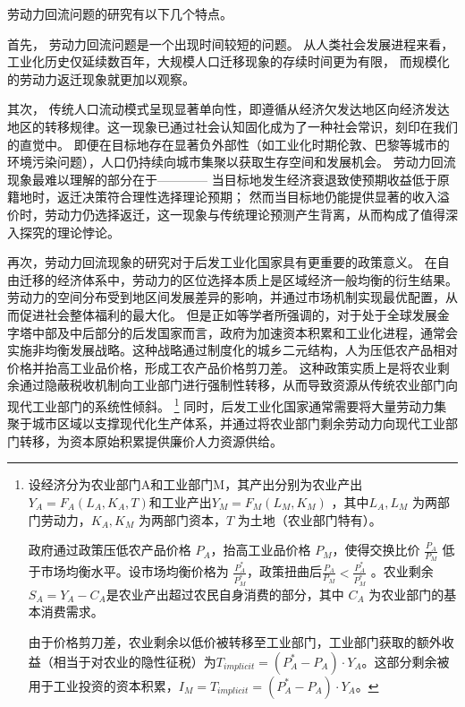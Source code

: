 \documentclass[a4paper,12pt,oneside, fontset=mac]{ctexbook} %
\begin{document}
劳动力回流问题的研究有以下几个特点。

首先，
劳动力回流问题是一个出现时间较短的问题。
从人类社会发展进程来看，工业化历史仅延续数百年，大规模人口迁移现象的存续时间更为有限，
而规模化的劳动力返迁现象就更加以观察。

其次，
传统人口流动模式呈现显著单向性，即遵循从经济欠发达地区向经济发达地区的转移规律。这一现象已通过社会认知固化成为了一种社会常识，刻印在我们的直觉中。
即便在目标地存在显著负外部性（如工业化时期伦敦、巴黎等城市的环境污染问题），人口仍持续向城市集聚以获取生存空间和发展机会。
劳动力回流现象最难以理解的部分在于————
当目标地发生经济衰退致使预期收益低于原籍地时，返迁决策符合理性选择理论预期；
然而当目标地仍能提供显著的收入溢价时，劳动力仍选择返迁，这一现象与传统理论预测产生背离，从而构成了值得深入探究的理论悖论。

再次，劳动力回流现象的研究对于后发工业化国家具有更重要的政策意义。  
在自由迁移的经济体系中，劳动力的区位选择本质上是区域经济一般均衡的衍生结果。劳动力的空间分布受到地区间发展差异的影响，并通过市场机制实现最优配置，从而促进社会整体福利的最大化。
但是正如\cite{CaiFangHuJiZhiDuYuLaoDongLiShiChangBaoHu2001}等学者所强调的，对于处于全球发展金字塔中部及中后部分的后发国家而言，政府为加速资本积累和工业化进程，通常会实施非均衡发展战略。这种战略通过制度化的城乡二元结构，人为压低农产品相对价格并抬高工业品价格，形成工农产品价格剪刀差。
这种政策实质上是将农业剩余通过隐蔽税收机制向工业部门进行强制性转移，从而导致资源从传统农业部门向现代工业部门的系统性倾斜。
\footnote{
  设经济分为农业部门A和工业部门M，其产出分别为农业产出\( Y_A = F_A(L_A, K_A, T) \)和工业产出\( Y_M = F_M(L_M, K_M) \) ，其中\( L_A, L_M \) 为两部门劳动力，\( K_A, K_M \) 为两部门资本，\( T \) 为土地（农业部门特有）。

  政府通过政策压低农产品价格 \( P_A \)，抬高工业品价格 \( P_M \)，使得交换比价 \( \frac{P_A}{P_M} \) 低于市场均衡水平。设市场均衡价格为 \( \frac{P_A^*}{P_M^*} \)，政策扭曲后\(\frac{P_A}{P_M} < \frac{P_A^*}{P_M^*}\) 。农业剩余\(S_A = Y_A - C_A\)是农业产出超过农民自身消费的部分，其中 \( C_A \) 为农业部门的基本消费需求。  

  由于价格剪刀差，农业剩余以低价被转移至工业部门，工业部门获取的额外收益（相当于对农业的隐性征税）为\(T_{implicit} = (P_A^* - P_A) \cdot Y_A\)。这部分剩余被用于工业投资的资本积累，\(I_M = T_{implicit} = (P_A^* - P_A) \cdot Y_A\)。
}
同时，后发工业化国家通常需要将大量劳动力集聚于城市区域以支撑现代化生产体系，并通过将农业部门剩余劳动力向现代工业部门转移，为资本原始积累提供廉价人力资源供给。
\end{document}
